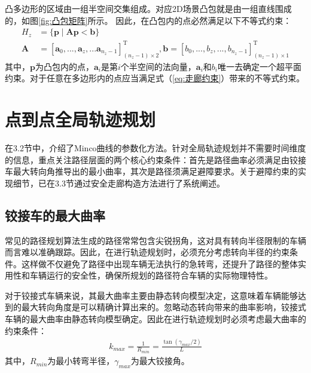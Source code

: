 \documentclass[master,academic]{ysuthesis} %
\begin{document}
	凸多边形的区域由一组半空间交集组成。对应2D场景凸包就是由一组直线围成的，如图\ref{fig:凸包矩阵}所示。
	因此，在凸包内的点必然满足以下不等式约束：
	\begin{equation}
		\begin{aligned}
			H_z&=\{\bm{p}\mid \bm{A}\bm{p}<\bm{b}\}\\
			\bm{A}&=\left[ \bm{a}_0,...,\bm{a}_z,...\bm{a}_{n_z-1} \right]^{\mathrm{T}}_{(n_z-1)\times 2},\bm{b}=\left[ b_0,...,b_z,...,b_{n_z-1} \right]^{\mathrm{T}}_{(n_z-1)\times 1}
		\end{aligned}
		\label{eq:走廊约束}
	\end{equation}
	其中，$\bm{p}$为凸包内的点，$\bm{a}_i$是第$i$个半空间的法向量，$\bm{a}_i$和$b_i$唯一去确定一个超平面约束。对于任意在多边形内的点应当满足式（\ref{eq:走廊约束}）带来的不等式约束。
	
	\section{点到点全局轨迹规划}
	在3.2节中，介绍了Minco曲线的参数化方法。针对全局轨迹规划并不需要时间维度的信息，重点关注路径层面的两个核心约束条件：首先是路径曲率必须满足由铰接车最大转向角推导出的最小曲率，其次是路径须满足避障要求。关于避障约束的实现细节，已在3.3节通过安全走廊构造方法进行了系统阐述。
		\subsection{铰接车的最大曲率}
		常见的路径规划算法生成的路径常常包含尖锐拐角，这对具有转向半径限制的车辆而言难以准确跟踪。因此，在进行轨迹规划时，必须充分考虑转向半径的约束条件。这样做不仅避免了路径中出现车辆无法执行的急转弯，还提升了路径的整体实用性和车辆运行的安全性，确保所规划的路径符合车辆的实际物理特性。

		对于铰接式车辆来说，其最大曲率主要由静态转向模型决定，这意味着车辆能够达到的最大转向角度是可以精确计算出来的。忽略动态转向带来的曲率影响，铰接式车辆的最大曲率由静态转向模型确定。因此在进行轨迹规划时必须考虑最大曲率的约束条件：
		\begin{equation}
			\begin{aligned}
				k_{max}=\frac{1}{R_{min}}=\frac{\tan( \gamma _{max}/2 )}{L}
			\end{aligned}
			\label{eq:kmax}
		\end{equation}
		其中，$R_{min}$为最小转弯半径，$\gamma_{max}$为最大铰接角。
\end{document}
